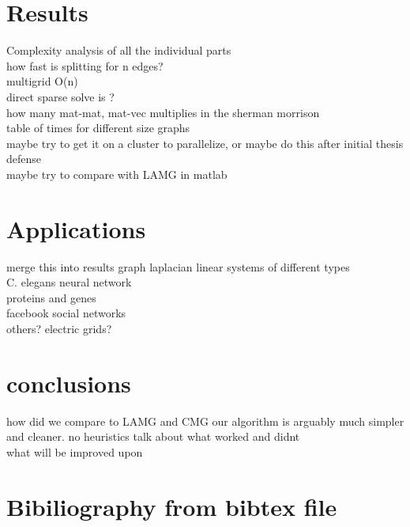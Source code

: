 \documentclass{article}
\begin{document}
\section{Results}
Complexity analysis of all the individual parts\\
how fast is splitting for n edges?\\
multigrid O(n)\\
direct sparse solve is ?\\
how many mat-mat, mat-vec multiplies in the sherman morrison\\
table of times for different size graphs\\
maybe try to get it on a cluster to parallelize, or maybe do this after initial thesis defense\\
maybe try to compare with LAMG in matlab\\

\section{Applications}
merge this into results
graph laplacian linear systems of different types\\
C. elegans neural network\\
proteins and genes\\
facebook social networks\\
others? electric grids?\\

\section{conclusions}
how did we compare to LAMG and CMG
our algorithm is arguably much simpler and cleaner. no heuristics
talk about what worked and didnt\\
what will be improved upon\\

\section{Bibiliography from bibtex file}


\end{document}
